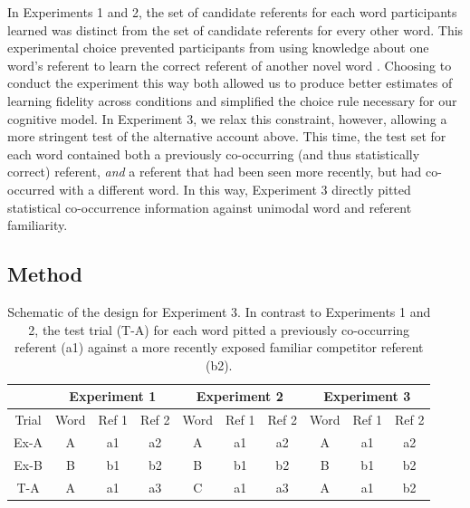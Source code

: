 \documentclass[authoryear,review]{elsarticle}
\begin{document}
In Experiments 1 and 2, the set of candidate referents for each word participants learned was distinct from the set of candidate referents for every other word. This experimental choice prevented participants from using knowledge about one word's referent to learn the correct referent of another novel word \cite[c.f.][]{Smith2011a,Yurovsky2013}. Choosing to conduct the experiment this way both allowed us to produce better estimates of learning fidelity across conditions and simplified the choice rule necessary for our cognitive model. In Experiment 3, we relax this constraint, however, allowing a more stringent test of the alternative account above. This time, the test set for each word contained both a previously co-occurring (and thus statistically correct) referent, \emph{and} a referent that had been seen more recently, but had co-occurred with a different word. In this way, Experiment 3 directly pitted statistical co-occurrence information against unimodal word and referent familiarity.

\subsection{Method}

\begin{table}[tb]
\begin{center}
\begin{tabular}{| c | c c c | c c c | c c c |}
\multicolumn{1}{c}{ }
 & \multicolumn{3}{c}{Experiment 1}
 & \multicolumn{3}{c}{Experiment 2}
 & \multicolumn{3}{c}{Experiment 3} \\
 \hline
Trial & Word & Ref 1 & Ref 2 & Word & Ref 1 & Ref 2 & Word & Ref 1 & Ref 2 \\ 
\hline
Ex-A& A & a1 & a2 & A & a1 & a2 & A & a1 & a2 \\ 
Ex-B & B & b1 & b2 & B & b1 & b2 & B & b1 & b2 \\ 
T-A & A & a1 & a3 & C & a1 & a3 & A & a1 & b2 \\ 
\hline
\end{tabular}
\end{center}
\vspace{6pt}
\caption{\label{tab:exp3_design}Schematic of the design for Experiment 3. In contrast to Experiments 1 and 2, the test trial (T-A) for each word pitted a previously co-occurring referent (a1) against a more recently exposed familiar competitor referent (b2).}
\end{table}
\end{document}
